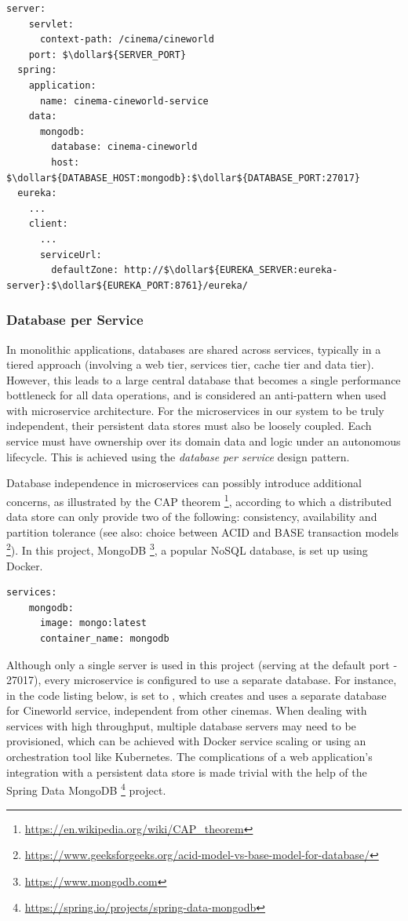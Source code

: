 \begin{lstlisting}[caption=Snippet from \code{cinema-cineworld-service} \code{application.yml} file]
  server:
    servlet:
      context-path: /cinema/cineworld
    port: $\dollar${SERVER_PORT}
  spring:
    application:
      name: cinema-cineworld-service
    data:
      mongodb:
        database: cinema-cineworld
        host: $\dollar${DATABASE_HOST:mongodb}:$\dollar${DATABASE_PORT:27017}
  eureka:
    ...
    client:
      ...
      serviceUrl:
        defaultZone: http://$\dollar${EUREKA_SERVER:eureka-server}:$\dollar${EUREKA_PORT:8761}/eureka/
\end{lstlisting}

\subsubsection{Database per Service}

In monolithic applications, databases are shared across services, typically in a tiered approach (involving a web tier, services tier, cache tier and data tier). However, this leads to a large central database that becomes a single performance bottleneck for all data operations, and is considered an anti-pattern when used with microservice architecture. For the microservices in our system to be truly independent, their persistent data stores must also be loosely coupled. Each service must have ownership over its domain data and logic under an autonomous lifecycle. This is achieved using the \textit{database per service} design pattern.

Database independence in microservices can possibly introduce additional concerns, as illustrated by the CAP theorem \footnote{\url{https://en.wikipedia.org/wiki/CAP_theorem}}, according to which a distributed data store can only provide two of the following: consistency, availability and partition tolerance (see also: choice between ACID and BASE transaction models \footnote{\url{https://www.geeksforgeeks.org/acid-model-vs-base-model-for-database/}}). In this project, MongoDB \footnote{\url{https://www.mongodb.com}}, a popular NoSQL database, is set up using Docker.

\begin{lstlisting}[caption=Docker Compose file snippet for MongoDB server]
  services:
    mongodb:
      image: mongo:latest
      container_name: mongodb
\end{lstlisting}

Although only a single server is used in this project (serving at the default port - 27017), every microservice is configured to use a separate database. For instance, in the code listing below,  is set to , which creates and uses a separate database for Cineworld service, independent from other cinemas. When dealing with services with high throughput, multiple database servers may need to be provisioned, which can be achieved with Docker service scaling or using an orchestration tool like Kubernetes. The complications of a web application's integration with a persistent data store is made trivial with the help of the Spring Data MongoDB \footnote{\url{https://spring.io/projects/spring-data-mongodb}} project.

